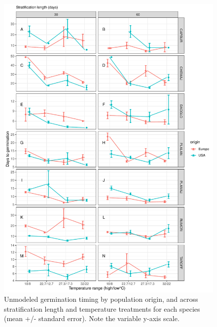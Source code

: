 \documentclass[12pt]{article}\usepackage[]{graphicx}\usepackage[]{color}
\begin{document}
\begin{figure}[H]
  \centering
  \includegraphics[scale=.8]{figure7} %
  \caption{Unmodeled germination timing by population origin, and across stratification length and temperature treatments for   each species (mean +/- standard error). Note the variable y-axis scale.} \label{fig:rawtime} 
\end{figure}
\end{document}
